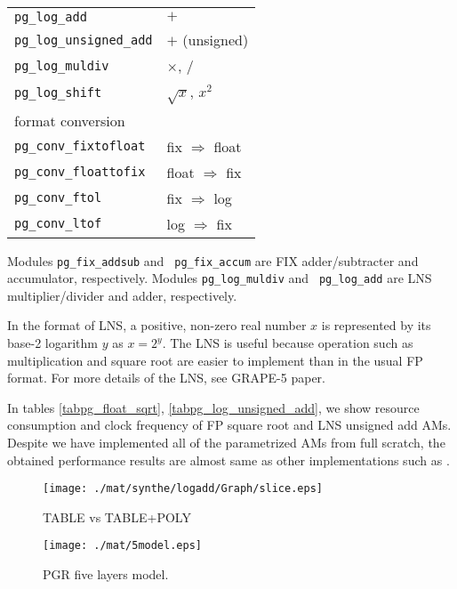 \documentclass{llncs}
\begin{document}
\begin{table}
\begin{center}
\begin{minipage}{.45\linewidth}
\begin{tabular}{ll}
	\hline
	{\tt pg\_log\_add}             &  $+$\\
	{\tt pg\_log\_unsigned\_add}   &  $+$ (unsigned)\\
	{\tt pg\_log\_muldiv}          &  $\times$, $/$\\
	{\tt pg\_log\_shift}           &  $\sqrt{x}$, $x^2$\\
	\hline
	format conversion & \\
	\hline
	{\tt pg\_conv\_fixtofloat}     &  fix $\Rightarrow$ float\\
	{\tt pg\_conv\_floattofix}     &  float $\Rightarrow$ fix\\
	{\tt pg\_conv\_ftol}           &  fix $\Rightarrow$ log\\
	{\tt pg\_conv\_ltof}           &  log $\Rightarrow$ fix\\
	\hline
      \end{tabular}
  \label{tabpgmod}
    \end{minipage}
  \end{center}
\end{table}

Modules {\tt pg\_fix\_addsub} and {\tt
pg\_fix\_accum} are FIX adder/subtracter and
accumulator, respectively.  Modules {\tt pg\_log\_muldiv} and {\tt
pg\_log\_add} are LNS multiplier/divider and adder, respectively.

In the format of LNS, a positive,
non-zero real number $x$ is represented by its base-2 logarithm $y$ as
$x=2^{y}$.
The LNS is useful because operation such as multiplication and square root
are easier to implement than in the usual FP format.
For more details of the LNS, see GRAPE-5 paper\cite{KFMT00}.

In tables \ref{tabpg_float_sqrt}, \ref{tabpg_log_unsigned_add}, we show
resource consumption and clock frequency of FP square root and LNS unsigned add AMs.
Despite we have implemented all of the parametrized AMs
from full scratch, the obtained performance results
are almost same as other implementations such as \cite{LKM02}.


\begin{figure}[htb]
\begin{center}
  \begin{minipage}{.45\linewidth}
      \texttt{[image: ./mat/synthe/logadd/Graph/slice.eps]}
      \caption{TABLE vs TABLE+POLY}
      \label{LADD_SLICE}
  \end{minipage}
  \hspace{2.7pc}
  \begin{minipage}{.45\linewidth}
    \texttt{[image: ./mat/5model.eps]}
    \caption{PGR five layers model.}
    \label{fig5model}
  \end{minipage}
\end{center}
\end{figure}
\end{document}
